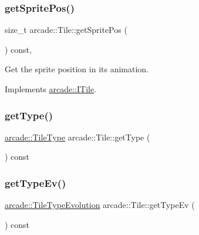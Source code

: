 \subsubsection{\texorpdfstring{get\+Sprite\+Pos()}{getSpritePos()}}
{\footnotesize\ttfamily size\+\_\+t arcade\+::\+Tile\+::get\+Sprite\+Pos (\begin{DoxyParamCaption}{ }\end{DoxyParamCaption}) const\hspace{0.3cm}{\ttfamily [override]}, {\ttfamily [virtual]}}



Get the sprite position in it\textquotesingle{}s animation. 



Implements \hyperlink{classarcade_1_1_i_tile_a3e5cec4407ef6afb7e10d82fb1c93f5e}{arcade\+::\+I\+Tile}.

\mbox{\label{classarcade_1_1_tile_a41277c86970f33f4a5a45d1e3233c45c}} 
\subsubsection{\texorpdfstring{get\+Type()}{getType()}}
{\footnotesize\ttfamily \hyperlink{namespacearcade_a61ba576694ea309cdf2b4b66902408ca}{arcade\+::\+Tile\+Type} arcade\+::\+Tile\+::get\+Type (\begin{DoxyParamCaption}{ }\end{DoxyParamCaption}) const}

\mbox{\label{classarcade_1_1_tile_a26e592479e0feb1ea584b3e96cb22ea4}} 
\subsubsection{\texorpdfstring{get\+Type\+Ev()}{getTypeEv()}}
{\footnotesize\ttfamily \hyperlink{namespacearcade_a2e0a64a64203f78c9efb84a1475a8cf4}{arcade\+::\+Tile\+Type\+Evolution} arcade\+::\+Tile\+::get\+Type\+Ev (\begin{DoxyParamCaption}{ }\end{DoxyParamCaption}) const}

\mbox{\label{classarcade_1_1_tile_abb9bfea961e713a36213627d0787aae2}} 

